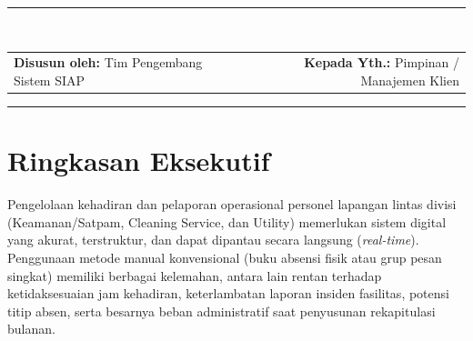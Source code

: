 \documentclass[11pt,a4paper]{article}
\begin{document}
\begin{titlepage}
    \vspace{0.8cm}
    \rule{\textwidth}{0.8pt}\\[6pt]
    \begin{tabularx}{\textwidth}{@{}Xr@{}}
        \textbf{Disusun oleh:} Tim Pengembang Sistem SIAP & \textbf{Kepada Yth.:} Pimpinan / Manajemen Klien \\
    \end{tabularx}
\end{titlepage}

\tableofcontents
\vspace{8pt}
\rule{\textwidth}{0.4pt}
\newpage

\section{Ringkasan Eksekutif}

Pengelolaan kehadiran dan pelaporan operasional personel lapangan lintas divisi (Keamanan/Satpam, Cleaning Service, dan Utility) memerlukan sistem digital yang akurat, terstruktur, dan dapat dipantau secara langsung (\textit{real-time}). Penggunaan metode manual konvensional (buku absensi fisik atau grup pesan singkat) memiliki berbagai kelemahan, antara lain rentan terhadap ketidaksesuaian jam kehadiran, keterlambatan laporan insiden fasilitas, potensi titip absen, serta besarnya beban administratif saat penyusunan rekapitulasi bulanan.
\end{document}
